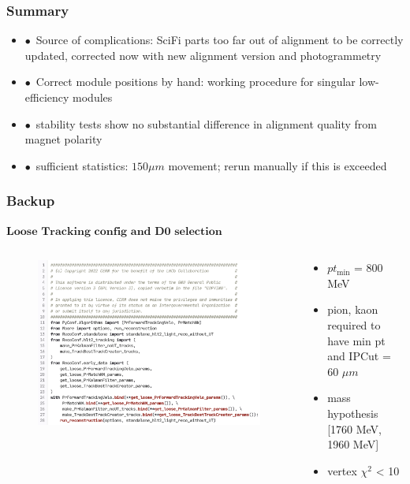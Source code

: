 \documentclass[aspectratio=1610, 12pt, xcolor=dvipsnames]{beamer}
\begin{document}
\begin{frame}\frametitle{Summary}
  \begin{itemize}
    \setlength\itemsep{0em}
    \item $\bullet$\, Source of complications: SciFi parts too far out of alignment to be correctly updated, corrected now with new alignment version and photogrammetry
    \item $\bullet$\, Correct module positions by hand: working procedure for singular low-efficiency modules
    \item $\bullet$\, stability tests show no substantial difference in alignment quality from magnet polarity
    \item $\bullet$\, sufficient statistics: $150 \mu m$ movement; rerun manually if this is exceeded
  \end{itemize}
\end{frame}

%  

\begin{frame}\frametitle{Backup}
  $\textbf{Loose Tracking config and D0 selection}$
  \begin{columns}
    \begin{column}[c]{0.48\textwidth}
      \begin{figure}
        \includegraphics[width=\textwidth]{plots/loose_tracking.png}
      \end{figure}
    \end{column}
    \begin{column}[c]{0.48\textwidth}
      \begin{itemize}
        \item $pt_\text{min}$ = 800 MeV
        \item pion, kaon required to have min pt and IPCut = 60 $\mu m$
        \item mass hypothesis [1760 MeV, 1960 MeV]
        \item vertex $\chi^2$ < 10
      \end{itemize}
    \end{column}
  \end{columns}
\end{frame}
\end{document}

